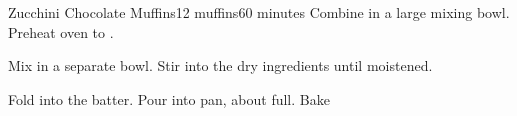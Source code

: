 \documentclass[../Cookbook.tex]{subfiles}
\begin{document}
\begin{recipe}[ZucchiniChocolateMuffins]{Zucchini Chocolate Muffins}{12 muffins}{60 minutes}
	Combine in a large mixing bowl.
	Preheat oven to .

	Mix in a separate bowl.
	Stir into the dry ingredients until moistened.

	Fold into the batter.
	Pour into pan, about  full.
	Bake 
\end{recipe}
\end{document}
